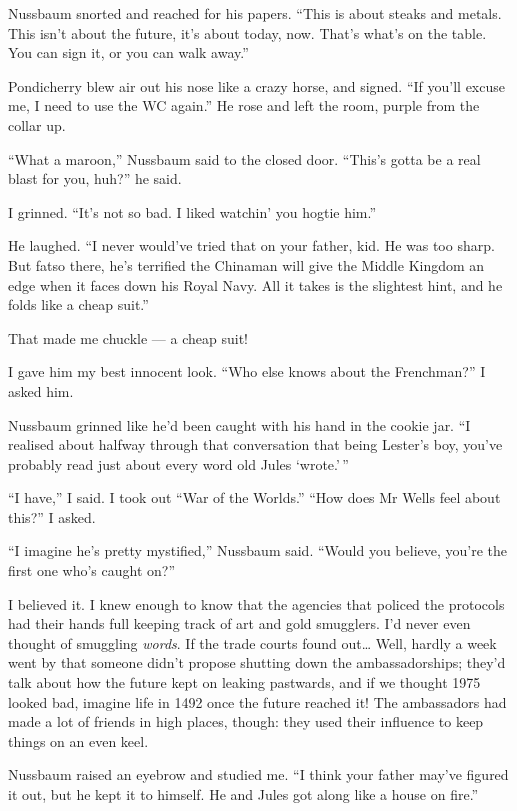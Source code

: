 Nussbaum snorted and reached for his papers.
``This is about steaks and metals. This isn't about the future, it's about 
today, now. That's what's on the table. You can sign it, or you can walk away.''

Pondicherry blew air out his nose like a crazy horse, and signed.
``If you'll excuse me, I need to use the WC again.'' He rose and
left the room, purple from the collar up.

``What a maroon,'' Nussbaum said to the closed door.
``This's gotta be a real blast for you, huh?'' he said.

I grinned. ``It's not so bad. I liked watchin' you hogtie him.''

He laughed.
``I never would've tried that on your father, kid. He was too sharp. But fatso 
there, he's terrified the Chinaman will give the Middle Kingdom an edge when it 
faces down his Royal Navy. All it takes is the slightest hint, and he folds 
like a cheap suit.''

That made me chuckle --- a cheap suit!

I gave him my best innocent look.
``Who else knows about the Frenchman?'' I asked him.

Nussbaum grinned like he'd been caught with his hand in the cookie
jar.
``I realised about halfway through that conversation that being Lester's boy, 
you've probably read just about every word old Jules `wrote.'\,''

``I have,'' I said. I took out ``War of the Worlds.''
``How does Mr Wells feel about this?'' I asked.

``I imagine he's pretty mystified,'' Nussbaum said.
``Would you believe, you're the first one who's caught on?''

I believed it. I knew enough to know that the agencies that policed
the protocols had their hands full keeping track of art and gold
smugglers. I'd never even thought of smuggling \emph{words}. If the
trade courts found out\ldots{} Well, hardly a week went by that
someone didn't propose shutting down the ambassadorships; they'd
talk about how the future kept on leaking pastwards, and if we
thought 1975 looked bad, imagine life in 1492 once the future
reached it! The ambassadors had made a lot of friends in high
places, though: they used their influence to keep things on an even
keel.

Nussbaum raised an eyebrow and studied me.
``I think your father may've figured it out, but he kept it to himself. He and 
Jules got along like a house on fire.''

